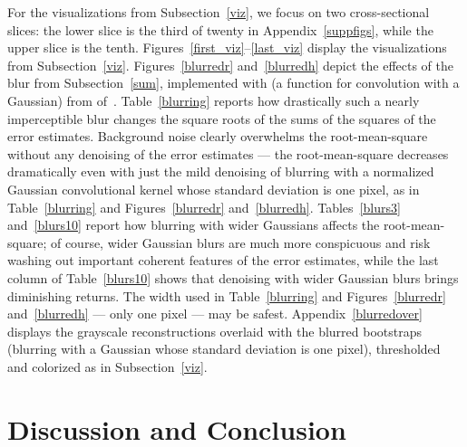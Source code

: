 \documentclass[article]{jdssv}
\begin{document}
For the visualizations from Subsection~\ref{viz},
we focus on two cross-sectional slices:
the lower slice is the third of twenty in Appendix~\ref{suppfigs},
while the upper slice is the tenth.
Figures~\ref{first_viz}--\ref{last_viz} display the visualizations
from Subsection~\ref{viz}.
Figures~\ref{blurredr} and~\ref{blurredh} depict the effects
of the blur from Subsection~\ref{sum}, implemented
with 
(a function for convolution with a Gaussian)
from  of~\citet{scikit-image}.
Table~\ref{blurring} reports how drastically
such a nearly imperceptible blur changes
the square roots of the sums of the squares of the error estimates.
Background noise clearly overwhelms the root-mean-square without any denoising
of the error estimates --- the root-mean-square decreases dramatically
even with just the mild denoising of blurring
with a normalized Gaussian convolutional kernel
whose standard deviation is one pixel, as in Table~\ref{blurring}
and Figures~\ref{blurredr} and~\ref{blurredh}.
Tables~\ref{blurs3} and~\ref{blurs10} report how blurring with wider Gaussians
affects the root-mean-square; of course, wider Gaussian blurs
are much more conspicuous and risk washing out important coherent features
of the error estimates, while the last column of Table~\ref{blurs10} shows
that denoising with wider Gaussian blurs brings diminishing returns.
The width used in Table~\ref{blurring} and Figures~\ref{blurredr}
and~\ref{blurredh} --- only one pixel --- may be safest.
Appendix~\ref{blurredover} displays the grayscale reconstructions overlaid
with the blurred bootstraps (blurring with a Gaussian whose standard deviation
is one pixel), thresholded and colorized as in Subsection~\ref{viz}.




\section{Discussion and Conclusion}
\label{conclusion}
\end{document}
